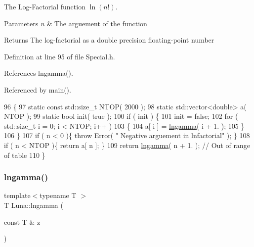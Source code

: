 The Log-\/\+Factorial function $ \ln(n!) $. 


\begin{DoxyParams}{Parameters}
{\em n} & The arguement of the function \\
\hline
\end{DoxyParams}
\begin{DoxyReturn}{Returns}
The log-\/factorial as a double precision floating-\/point number 
\end{DoxyReturn}


Definition at line 95 of file Special.\+h.



References lngamma().



Referenced by main().


\begin{DoxyCode}
96     \{
97       \textcolor{keyword}{static} \textcolor{keyword}{const} std::size\_t NTOP( 2000 );
98       \textcolor{keyword}{static} std::vector<double> a( NTOP );
99       \textcolor{keyword}{static} \textcolor{keywordtype}{bool} init( \textcolor{keyword}{true} );
100       \textcolor{keywordflow}{if} ( init ) \{
101         init = \textcolor{keyword}{false};
102         \textcolor{keywordflow}{for} ( std::size\_t i = 0; i < NTOP; i++ )
103         \{
104           a[ i ] = \hyperlink{namespaceLuna_a5682d79a57f8eb7e6c08654af8955d4c}{lngamma}( i + 1. );
105         \}
106       \}
107       \textcolor{keywordflow}{if} ( n < 0 )\{ \textcolor{keywordflow}{throw} Error( \textcolor{stringliteral}{" Negative arguement in lnfactorial"} ); \}
108       \textcolor{keywordflow}{if} ( n < NTOP )\{ \textcolor{keywordflow}{return} a[ n ]; \}
109       \textcolor{keywordflow}{return} \hyperlink{namespaceLuna_a5682d79a57f8eb7e6c08654af8955d4c}{lngamma}( n + 1. ); \textcolor{comment}{// Out of range of table}
110     \}
\end{DoxyCode}
\mbox{\label{namespaceLuna_a5682d79a57f8eb7e6c08654af8955d4c}} 
\subsubsection{\texorpdfstring{lngamma()}{lngamma()}}
{\footnotesize\ttfamily template$<$typename T $>$ \\
T Luna\+::lngamma (\begin{DoxyParamCaption}\item[{const T \&}]{z }\end{DoxyParamCaption})}



